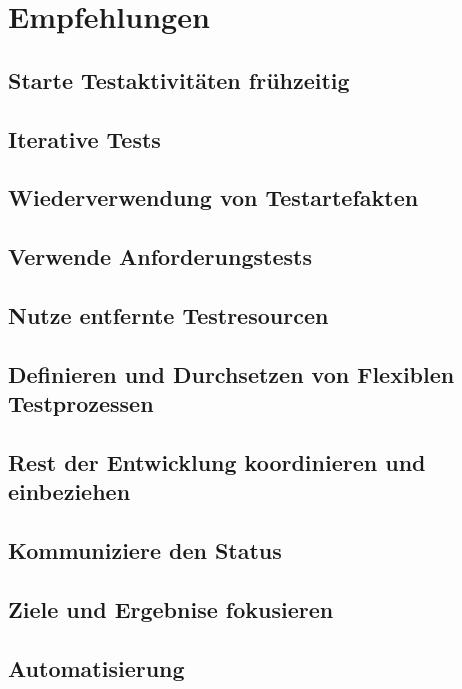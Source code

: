 \chapter{Empfehlungen}
\section{Starte Testaktivit\"aten fr\"uhzeitig}
\section{Iterative Tests}
\section{Wiederverwendung von Testartefakten}
\section{Verwende Anforderungstests}
\section{Nutze entfernte Testresourcen}
\section{Definieren und Durchsetzen von Flexiblen Testprozessen}
\section{Rest der Entwicklung koordinieren und einbeziehen}
\section{Kommuniziere den Status}
\section{Ziele und Ergebnise fokusieren}
\section{Automatisierung}